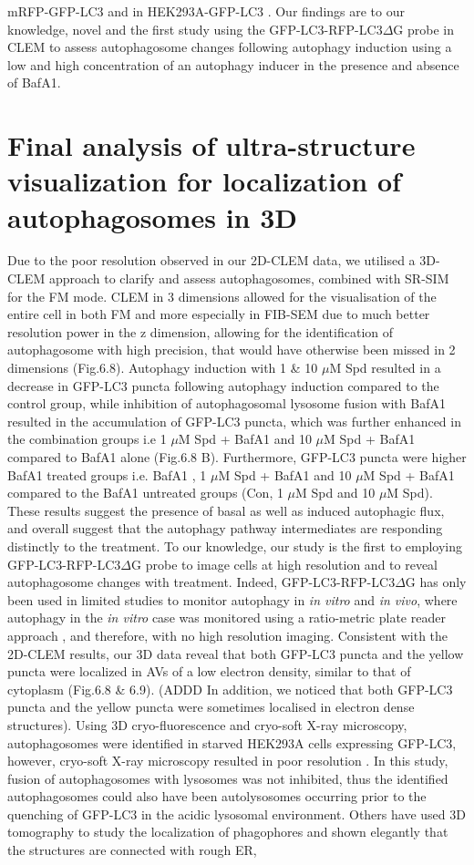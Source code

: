 mRFP-GFP-LC3 \citep{Gudmundsson2019} and in HEK293A-GFP-LC3 \citep{Razi2009}. Our findings are to our knowledge, novel and the first study using the GFP-LC3-RFP-LC3$\Delta$G probe in CLEM to assess autophagosome changes following autophagy induction using a low and high concentration  of an autophagy inducer in the presence and absence of BafA1.
\section{Final analysis of ultra-structure visualization for localization of autophagosomes in 3D}
Due to the poor resolution observed in our 2D-CLEM data, we utilised a  3D-CLEM approach to clarify and assess autophagosomes, combined with SR-SIM for the FM mode. CLEM in 3 dimensions allowed for the visualisation of the entire cell in both FM and more especially in FIB-SEM due to much better resolution power in the z dimension, allowing for the identification of autophagosome with high precision, that would have otherwise been missed in 2 dimensions (Fig.6.8). Autophagy induction with 1 \& 10 $\mu$M Spd resulted in a decrease in GFP-LC3 puncta following autophagy induction compared to the control group, while inhibition of autophagosomal lysosome fusion with BafA1 resulted in the accumulation of GFP-LC3 puncta, which was further enhanced in the combination groups i.e 1 $\mu$M Spd + BafA1 and 10 $\mu$M Spd + BafA1 compared to BafA1 alone (Fig.6.8 B). Furthermore, GFP-LC3 puncta were higher BafA1 treated groups i.e. BafA1 , 1 $\mu$M Spd + BafA1 and 10 $\mu$M Spd + BafA1 compared to the BafA1 untreated groups (Con, 1 $\mu$M Spd and 10 $\mu$M Spd). These results suggest the presence of basal as well as induced autophagic flux, and overall suggest that the autophagy pathway intermediates are responding distinctly to the treatment. To our knowledge, our study is the first to employing GFP-LC3-RFP-LC3$\Delta$G probe to image cells at high resolution and to reveal autophagosome changes with treatment. Indeed, GFP-LC3-RFP-LC3$\Delta$G has only been used in limited studies to monitor autophagy in \textit{in vitro} and \textit{in vivo}, where autophagy in the \textit{in vitro} case was monitored using a ratio-metric plate reader approach \citep{Kaizuka2016}, and therefore, with no high resolution imaging. Consistent with the 2D-CLEM results, our 3D data reveal that both GFP-LC3 puncta and the yellow puncta were localized in AVs of a low electron density, similar to that of cytoplasm (Fig.6.8 \& 6.9). (ADDD In addition, we noticed that both GFP-LC3 puncta and the yellow puncta were sometimes localised in electron dense structures). Using 3D cryo-fluorescence and cryo-soft X-ray microscopy, autophagosomes were identified in starved HEK293A cells expressing GFP-LC3, however, cryo-soft X-ray microscopy resulted in poor resolution \citep{Duke2014}. In this study, fusion of autophagosomes with lysosomes was not inhibited, thus the identified autophagosomes could also have been autolysosomes occurring prior to the quenching of GFP-LC3 in the acidic lysosomal environment. Others have used 3D tomography to study the localization of phagophores and shown elegantly that the structures are connected with rough ER, 